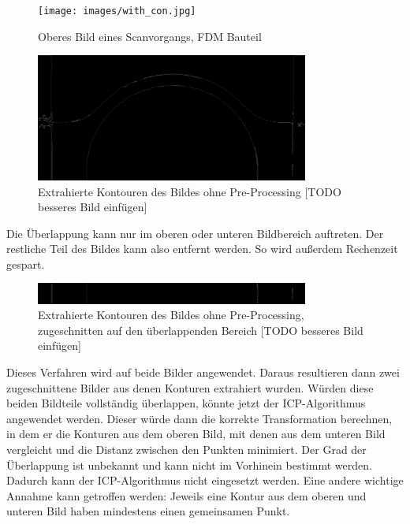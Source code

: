 \begin{figure}[h]
    \centering
    \texttt{[image: images/with\_con.jpg]} %
    \caption{Oberes Bild eines Scanvorgangs, FDM Bauteil}
    \label{fig:image_top}
\end{figure}

\begin{figure}[h]
    \centering
    \includegraphics[width=0.8\textwidth]{images/only_con.jpg} %
    \caption{Extrahierte Kontouren des Bildes ohne Pre-Processing [TODO besseres Bild einfügen]}
    \label{fig:cons}
\end{figure}

Die Überlappung kann nur im oberen oder unteren Bildbereich auftreten. Der restliche 
Teil des Bildes kann also entfernt werden. So wird außerdem Rechenzeit gespart.

\begin{figure}[h]
    \centering
    \includegraphics[width=0.8\textwidth]{images/only_con_cut.jpg} %
    \caption{Extrahierte Kontouren des Bildes ohne Pre-Processing, zugeschnitten 
    auf den überlappenden Bereich [TODO besseres Bild einfügen]}
    \label{fig:cons_cut}
\end{figure}

Dieses Verfahren wird auf beide Bilder angewendet. Daraus resultieren dann zwei 
zugeschnittene Bilder aus denen Konturen extrahiert wurden. 
Würden diese beiden Bildteile vollständig überlappen, könnte jetzt der ICP-Algorithmus
angewendet werden. Dieser würde dann die korrekte Transformation berechnen, in dem er 
die Konturen aus dem oberen Bild, mit denen aus dem unteren Bild vergleicht und die 
Distanz zwischen den Punkten minimiert. 
Der Grad der Überlappung ist unbekannt und kann nicht im Vorhinein bestimmt werden.
Dadurch kann der ICP-Algorithmus nicht eingesetzt werden. 
Eine andere wichtige Annahme kann getroffen werden: Jeweils eine Kontur aus 
dem oberen und unteren Bild haben mindestens einen gemeinsamen Punkt.

